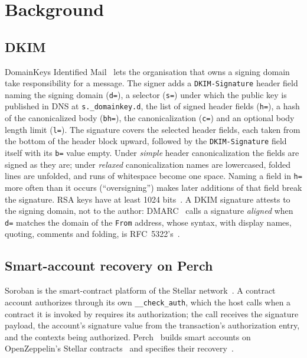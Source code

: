 \section{Background}\label{sec:background}

\subsection{DKIM}
DomainKeys Identified Mail~\cite{rfc6376} lets the organisation that owns a
signing domain take responsibility for a message. The signer adds a
\texttt{DKIM-Signature} header field naming the signing domain
(\texttt{d=}), a selector (\texttt{s=}) under which the public key is
published in DNS at \texttt{s.\_domainkey.d}, the list of signed header
fields (\texttt{h=}), a hash of the canonicalized body (\texttt{bh=}), the
canonicalization (\texttt{c=}) and an optional body length limit
(\texttt{l=}). The signature covers the selected header fields, each taken
from the bottom of the header block upward, followed by the
\texttt{DKIM-Signature} field itself with its \texttt{b=} value empty. Under
\emph{simple} header canonicalization the fields are signed as they are;
under \emph{relaxed} canonicalization names are lowercased, folded lines are
unfolded, and runs of whitespace become one space. Naming a field in
\texttt{h=} more often than it occurs (``oversigning'') makes later
additions of that field break the signature. RSA keys have at least 1024
bits~\cite{rfc8301}. A DKIM signature attests to the signing domain, not to
the author: DMARC~\cite{rfc7489} calls a signature \emph{aligned} when
\texttt{d=} matches the domain of the \texttt{From} address, whose syntax,
with display names, quoting, comments and folding, is
RFC~5322's~\cite{rfc5322}.

\subsection{Smart-account recovery on Perch}
Soroban is the smart-contract platform of the Stellar
network~\cite{soroban-docs}. A contract account authorizes through its own
\texttt{\_\_check\_auth}, which the host calls when a contract it is invoked
by requires its authorization; the call receives the signature payload, the
account's signature value from the transaction's authorization entry, and
the contexts being authorized. Perch~\cite{perch-repo} builds smart accounts
on OpenZeppelin's Stellar contracts~\cite{oz-stellar-contracts} and specifies
their recovery~\cite{perch-recovery-spec}.

